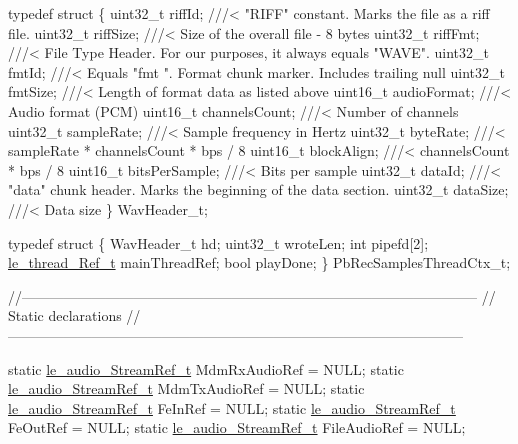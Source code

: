 \begin{DoxyCodeInclude}
\textcolor{keyword}{typedef} \textcolor{keyword}{struct }\{
    uint32\_t riffId;         \textcolor{comment}{///< "RIFF" constant. Marks the file as a riff file.}
\textcolor{comment}{}    uint32\_t riffSize;       \textcolor{comment}{///< Size of the overall file - 8 bytes}
\textcolor{comment}{}    uint32\_t riffFmt;        \textcolor{comment}{///< File Type Header. For our purposes, it always equals "WAVE".}
\textcolor{comment}{}    uint32\_t fmtId;          \textcolor{comment}{///< Equals "fmt ". Format chunk marker. Includes trailing null}
\textcolor{comment}{}    uint32\_t fmtSize;        \textcolor{comment}{///< Length of format data as listed above}
\textcolor{comment}{}    uint16\_t audioFormat;    \textcolor{comment}{///< Audio format (PCM)}
\textcolor{comment}{}    uint16\_t channelsCount;  \textcolor{comment}{///< Number of channels}
\textcolor{comment}{}    uint32\_t sampleRate;     \textcolor{comment}{///< Sample frequency in Hertz}
\textcolor{comment}{}    uint32\_t byteRate;       \textcolor{comment}{///< sampleRate * channelsCount * bps / 8}
\textcolor{comment}{}    uint16\_t blockAlign;     \textcolor{comment}{///< channelsCount * bps / 8}
\textcolor{comment}{}    uint16\_t bitsPerSample;  \textcolor{comment}{///< Bits per sample}
\textcolor{comment}{}    uint32\_t dataId;         \textcolor{comment}{///< "data" chunk header. Marks the beginning of the data section.}
\textcolor{comment}{}    uint32\_t dataSize;       \textcolor{comment}{///< Data size}
\textcolor{comment}{}\} WavHeader\_t;

\textcolor{keyword}{typedef} \textcolor{keyword}{struct}
\{
    WavHeader\_t hd;
    uint32\_t wroteLen;
    \textcolor{keywordtype}{int} pipefd[2];
    \hyperlink{le__thread_8h_a32121104c6b4ca39008eb79a4d6862f2}{le\_thread\_Ref\_t} mainThreadRef;
    \textcolor{keywordtype}{bool} playDone;
\}
PbRecSamplesThreadCtx\_t;

\textcolor{comment}{//--------------------------------------------------------------------------------------------------}
\textcolor{comment}{//                                       Static declarations}
\textcolor{comment}{//--------------------------------------------------------------------------------------------------}

\textcolor{keyword}{static} \hyperlink{le__audio__interface_8h_a9a46ff5a5afa61f1bc76120ab9e4da0a}{le\_audio\_StreamRef\_t} MdmRxAudioRef = NULL;
\textcolor{keyword}{static} \hyperlink{le__audio__interface_8h_a9a46ff5a5afa61f1bc76120ab9e4da0a}{le\_audio\_StreamRef\_t} MdmTxAudioRef = NULL;
\textcolor{keyword}{static} \hyperlink{le__audio__interface_8h_a9a46ff5a5afa61f1bc76120ab9e4da0a}{le\_audio\_StreamRef\_t} FeInRef = NULL;
\textcolor{keyword}{static} \hyperlink{le__audio__interface_8h_a9a46ff5a5afa61f1bc76120ab9e4da0a}{le\_audio\_StreamRef\_t} FeOutRef = NULL;
\textcolor{keyword}{static} \hyperlink{le__audio__interface_8h_a9a46ff5a5afa61f1bc76120ab9e4da0a}{le\_audio\_StreamRef\_t} FileAudioRef = NULL;


\end{DoxyCodeInclude}
